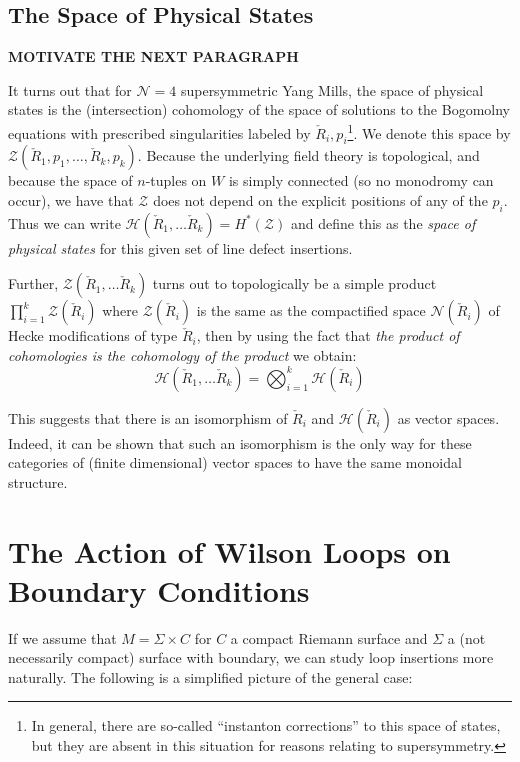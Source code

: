 	\subsection{The Space of Physical States}
	
	\textbf{MOTIVATE THE NEXT PARAGRAPH}
	
	It turns out that for $\mathcal N = 4$ supersymmetric Yang Mills, the space of physical states is the (intersection) cohomology of the space of solutions to the Bogomolny equations with prescribed singularities labeled by $\check R_i, p_i$\footnote{In general, there are so-called ``instanton corrections'' to this space of states, but they are absent in this situation for reasons relating to supersymmetry.}. We denote this space by $\mathcal Z(\check R_1, p_1, \dots, \check R_k, p_k)$. Because the underlying field theory is topological, and because the space of $n$-tuples on $W$ is simply connected (so no monodromy can occur), we have that $\mathcal Z$ does not depend on the explicit positions of any of the $p_i$. Thus we can write $\mathcal H (\check R_1, \dots \check R_k) = H^*(\mathcal Z)$ and define this as the \emph{space of physical states} for this given set of line defect insertions.
	
	Further, $\mathcal Z(\check R_1, \dots \check R_k)$ turns out to topologically be a simple product $\prod_{i=1}^k \mathcal Z(\check R_i)$ where $\mathcal Z(\check R_i)$ is the same as the compactified space $\mathcal N(\check R_i)$ of Hecke modifications of type $\check R_i$, then by using the fact that \emph{the product of cohomologies is the cohomology of the product} we obtain:
	\begin{equation}
		\mathcal H(\check R_1, \dots \check R_k) = \bigotimes_{i=1}^k \mathcal H(\check R_i)
	\end{equation}
	
	This suggests that there is an isomorphism of $\check R_i$ and $\mathcal H(\check R_i)$ as vector spaces. Indeed, it can be shown that such an isomorphism is the only way for these categories of (finite dimensional) vector spaces to have the same monoidal structure.
	
	\section{The Action of Wilson Loops on Boundary Conditions}
	
	If we assume that $M = \Sigma \times C$ for $C$ a compact Riemann surface and $\Sigma$ a (not necessarily compact) surface with boundary, we can study loop insertions more naturally. The following is a simplified picture of the general case:

